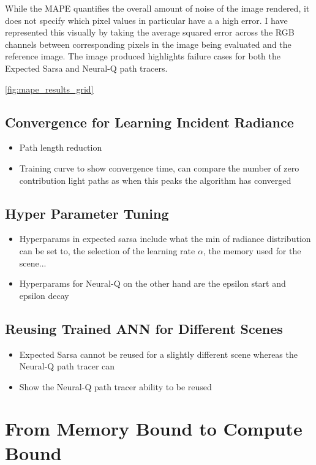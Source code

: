\documentclass[../dissertation.tex]{subfiles}
\begin{document}
While the MAPE quantifies the overall amount of noise of the image rendered, it does not specify which pixel values in particular have a a high error. I have represented this visually by taking the average squared error across the RGB channels between corresponding pixels in the image being evaluated and the reference image. The image produced highlights failure cases for both the Expected Sarsa and Neural-Q path tracers. 

\ref{fig:mape_results_grid}

\subsection{Convergence for Learning Incident Radiance}
\begin{itemize}
\item Path length reduction
\item Training curve to show convergence time, can compare the number of zero contribution light paths as when this peaks the algorithm has converged
\end{itemize}

\subsection{Hyper Parameter Tuning}
\begin{itemize}
\item Hyperparams in expected sarsa include what the min of radiance distribution can be set to, the selection of the learning rate $\alpha$, the memory used for the scene...
\item Hyperparams for Neural-Q on the other hand are the epsilon start and epsilon decay
\end{itemize}

\subsection{Reusing Trained ANN for Different Scenes}
\begin{itemize}
\item Expected Sarsa cannot be reused for a slightly different scene whereas the Neural-Q path tracer can 
\item Show the Neural-Q path tracer ability to be reused
\end{itemize}


\section{From Memory Bound to Compute Bound}
\end{document}
